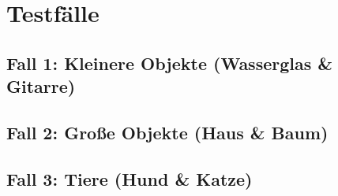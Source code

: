
\chapter{Testfälle}

\section{Fall 1: Kleinere Objekte (Wasserglas \& Gitarre)}
\section{Fall 2: Große Objekte (Haus \& Baum)}
\section{Fall 3: Tiere (Hund \& Katze)}
